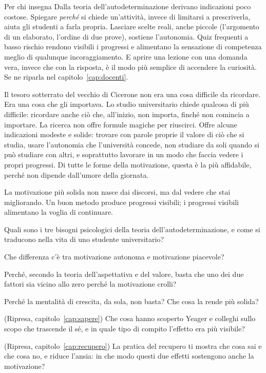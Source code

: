 \begin{riquadro}{Per chi insegna}
Dalla teoria dell'autodeterminazione derivano indicazioni poco costose.
Spiegare \emph{perché} si chiede un'attività, invece di limitarsi a
prescriverla, aiuta gli studenti a farla propria. Lasciare scelte
reali, anche piccole (l'argomento di un elaborato, l'ordine di due
prove), sostiene l'autonomia. Quiz frequenti a basso rischio rendono
visibili i progressi e alimentano la sensazione di competenza meglio di
qualunque incoraggiamento. E aprire una lezione con una domanda vera,
invece che con la risposta, è il modo più semplice di accendere la
curiosità. Se ne riparla nel capitolo~\ref{cap:docenti}.
\end{riquadro}

\asterismo

Il tesoro sotterrato del vecchio di Cicerone non era una cosa difficile
da ricordare. Era una cosa che gli importava. Lo studio universitario
chiede qualcosa di più difficile: ricordare anche ciò che, all'inizio,
non importa, finché non comincia a importare. La ricerca non offre
formule magiche per riuscirci. Offre alcune indicazioni modeste e
solide: trovare con parole proprie il valore di ciò che si studia,
usare l'autonomia che l'università concede, non studiare da soli
quando si può studiare con altri, e soprattutto lavorare in un modo che
faccia vedere i propri progressi. Di tutte le forme della motivazione,
questa è la più affidabile, perché non dipende dall'umore della
giornata.

\begin{daricordare}
La motivazione più solida non nasce dai discorsi, ma dal vedere che
stai migliorando. Un buon metodo produce progressi visibili; i
progressi visibili alimentano la voglia di continuare.
\end{daricordare}

\begin{domande}
  \item Quali sono i tre bisogni psicologici della teoria
        dell'autodeterminazione, e come si traducono nella vita di uno
        studente universitario?
  \item Che differenza c'è tra motivazione autonoma e motivazione
        piacevole?
  \item Perché, secondo la teoria dell'aspettativa e del valore, basta
        che uno dei due fattori sia vicino allo zero perché la
        motivazione crolli?
  \item Perché la mentalità di crescita, da sola, non basta? Che cosa la
        rende più solida?
  \item (Ripresa, capitolo~\ref{cap:sapere}) Che cosa hanno scoperto
        Yeager e colleghi sullo scopo che trascende il sé, e in quale
        tipo di compito l'effetto era più visibile?
  \item (Ripresa, capitolo~\ref{cap:recupero}) La pratica del recupero
        ti mostra che cosa sai e che cosa no, e riduce l'ansia: in che
        modo questi due effetti sostengono anche la motivazione?
\end{domande}

